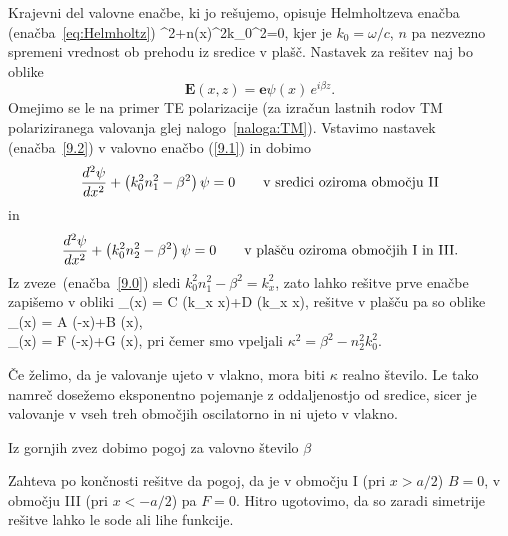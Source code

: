 Krajevni del valovne enačbe, ki jo rešujemo, opisuje Helmholtzeva enačba (enačba~\ref{eq:Helmholtz})
\beq
\nabla^{2}+n\left(x\right)^{2}k_{0}^{2}=0,
\label{9.1}
\eeq
kjer je $k_{0}=\omega/c$, $n$ pa nezvezno spremeni vrednost ob prehodu iz sredice v plašč. 
Nastavek za rešitev naj bo oblike 
\begin{equation}
{\mathbf E}(x,z)=\mathbf{e}\psi\left(x\right)\, e^{i\beta z}.
\label{9.2}
\end{equation}
Omejimo se le na primer TE polarizacije (za izračun lastnih rodov TM polariziranega
valovanja glej nalogo~\ref{naloga:TM}). Vstavimo nastavek (enačba~\ref{9.2}) v valovno enačbo
(\ref{9.1}) in dobimo
\begin{equation}
\frac{d^{2}{\bf \psi}}{dx^{2}}+\left(k_{0}^{2}n_1^{2}-\beta^{2}\right){\bf \psi}=0
\qquad \textrm{v sredici oziroma obmo\v cju II} 
\label{9.3}
\end{equation}
in 
\begin{equation}
\frac{d^{2}{\bf \psi}}{dx^{2}}+\left(k_{0}^{2}n_2^{2}-\beta^{2}\right){\bf \psi}=0
\qquad \textrm{v plašču oziroma obmo\v cjih I in III.} 
\label{9.3}
\end{equation}
Iz zveze~(enačba~\ref{9.0}) sledi $k_0^2n_1^2-\beta^2=k_x^2$, zato lahko rešitve prve enačbe
zapišemo v obliki
\beq
\psi_{}(x) = C \cos(k_x x)+D \sin(k_x x),
\eeq
rešitve v plašču pa so oblike
\beq
\psi_{}(x) = A \exp(-\kappa x)+B \exp(\kappa x),\\
\psi_{}(x) = F \exp(-\kappa x)+G \exp(\kappa x),
\eeq
pri čemer smo vpeljali $\kappa^2= \beta^2-n_2^2k_0^2$.

Če želimo, da je valovanje ujeto v vlakno, mora biti $\kappa$ realno število.
Le tako namreč dosežemo eksponentno pojemanje z oddaljenostjo od sredice,
sicer je valovanje v vseh treh območjih oscilatorno in ni ujeto v vlakno. 

Iz gornjih zvez dobimo pogoj za valovno število $\beta$

Zahteva po končnosti rešitve da pogoj, da je v območju I (pri $x>a/2$) $B=0$, 
v območju III (pri $x<-a/2$) pa $F=0$. Hitro ugotovimo, da so zaradi simetrije rešitve
lahko le sode ali lihe funkcije. 


